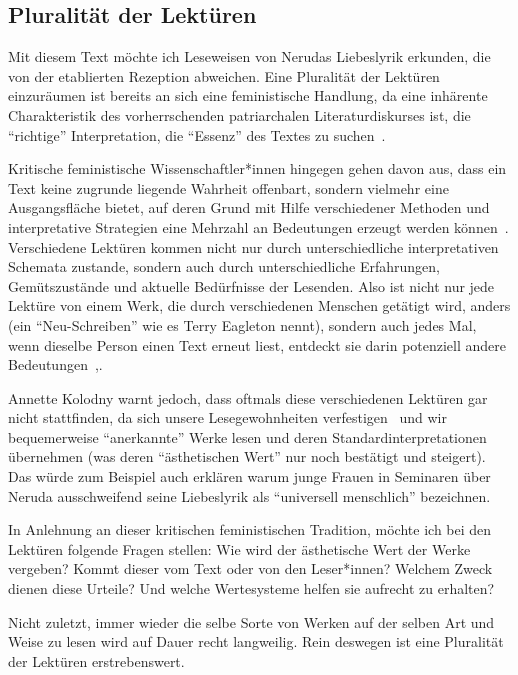 \subsection{Pluralität der Lektüren}

Mit diesem Text möchte ich Leseweisen von Nerudas Liebeslyrik erkunden, die von der etablierten Rezeption abweichen.
Eine Pluralität der Lektüren einzuräumen ist bereits an sich eine feministische Handlung,
da eine inhärente Charakteristik des vorherrschenden patriarchalen Literaturdiskurses ist, die ``richtige'' Interpretation, die ``Essenz'' des Textes zu suchen~\cite{Kolodny1980}.

Kritische feministische Wissenschaftler*innen hingegen gehen davon aus, dass ein Text keine zugrunde liegende Wahrheit offenbart, sondern vielmehr eine Ausgangsfläche bietet, auf deren Grund mit Hilfe verschiedener Methoden und interpretative Strategien eine Mehrzahl an Bedeutungen erzeugt werden können~\cite{Beehler1988}.
Verschiedene Lektüren kommen nicht nur durch unterschiedliche interpretativen Schemata zustande, sondern auch durch unterschiedliche Erfahrungen, Gemütszustände und aktuelle Bedürfnisse der Lesenden.
Also ist nicht nur jede Lektüre von einem Werk, die durch verschiedenen Menschen getätigt wird, anders (ein ``Neu-Schreiben'' wie es Terry Eagleton nennt), sondern auch jedes Mal, wenn dieselbe Person einen Text erneut liest, entdeckt sie darin potenziell andere Bedeutungen~\cite{Eagleton1997},\cite{Kolodny1980}.

Annette Kolodny warnt jedoch, dass oftmals diese verschiedenen Lektüren gar nicht stattfinden, da sich unsere Lesegewohnheiten verfestigen~\cite{Kolodny1980} und wir bequemerweise ``anerkannte'' Werke lesen und deren Standardinterpretationen übernehmen (was deren ``ästhetischen Wert'' nur noch bestätigt und steigert).
Das würde zum Beispiel auch erklären warum junge Frauen in Seminaren über Neruda ausschweifend seine Liebeslyrik als ``universell menschlich'' bezeichnen.

In Anlehnung an dieser kritischen feministischen Tradition, möchte ich bei den Lektüren folgende Fragen stellen: Wie wird der ästhetische Wert der Werke vergeben? Kommt dieser vom Text oder von den Leser*innen? 
Welchem Zweck dienen diese Urteile?
Und welche Wertesysteme helfen sie aufrecht zu erhalten?

Nicht zuletzt, immer wieder die selbe Sorte von Werken auf der selben Art und Weise zu lesen wird auf Dauer recht langweilig. %
Rein deswegen ist eine Pluralität der Lektüren erstrebenswert.
